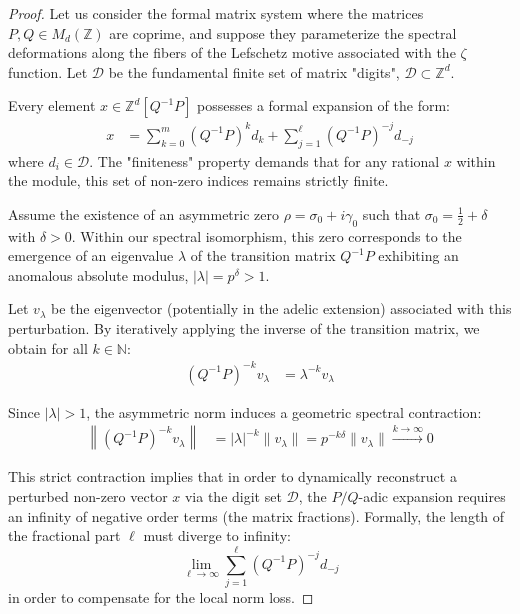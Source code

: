 \documentclass[
]{article}
\begin{document}
\begin{proof}
Let us consider the formal matrix system where the matrices $P, Q \in M_d(\mathbb{Z})$ are coprime, and suppose they parameterize the spectral deformations along the fibers of the Lefschetz motive associated with the $\zeta$ function. Let $\mathcal{D}$ be the fundamental finite set of matrix "digits", $\mathcal{D} \subset \mathbb{Z}^d$.

Every element $x \in \mathbb{Z}^d[Q^{-1}P]$ possesses a formal expansion of the form:
\begin{align*}
x &= \sum_{k=0}^{m} (Q^{-1}P)^k d_k + \sum_{j=1}^{\ell} (Q^{-1}P)^{-j} d_{-j}
\end{align*}
where $d_i \in \mathcal{D}$. The "finiteness" property demands that for any rational $x$ within the module, this set of non-zero indices remains strictly finite.

Assume the existence of an asymmetric zero $\rho = \sigma_0 + i\gamma_0$ such that $\sigma_0 = \frac{1}{2} + \delta$ with $\delta > 0$. Within our spectral isomorphism, this zero corresponds to the emergence of an eigenvalue $\lambda$ of the transition matrix $Q^{-1}P$ exhibiting an anomalous absolute modulus, $|\lambda| = p^{\delta} > 1$.

Let $v_{\lambda}$ be the eigenvector (potentially in the adelic extension) associated with this perturbation. By iteratively applying the inverse of the transition matrix, we obtain for all $k \in \mathbb{N}$:
\begin{align*}
(Q^{-1}P)^{-k} v_{\lambda} &= \lambda^{-k} v_{\lambda}
\end{align*}

Since $|\lambda| > 1$, the asymmetric norm induces a geometric spectral contraction:
\begin{align*}
\left\| (Q^{-1}P)^{-k} v_{\lambda} \right\| &= |\lambda|^{-k} \|v_{\lambda}\| = p^{-k\delta} \|v_{\lambda}\| \xrightarrow{k \to \infty} 0
\end{align*}

This strict contraction implies that in order to dynamically reconstruct a perturbed non-zero vector $x$ via the digit set $\mathcal{D}$, the $P/Q$-adic expansion requires an infinity of negative order terms (the matrix fractions). Formally, the length of the fractional part $\ell$ must diverge to infinity:
\begin{equation*}
\lim_{\ell \to \infty} \sum_{j=1}^{\ell} (Q^{-1}P)^{-j} d_{-j}
\end{equation*}
in order to compensate for the local norm loss.


\end{proof}
\end{document}
